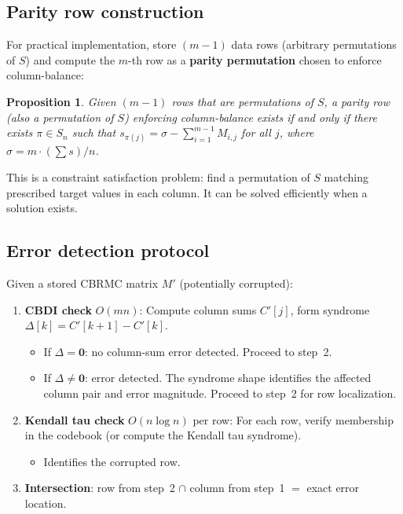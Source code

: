 \documentclass[11pt]{article}
\newtheorem{proposition}[theorem]{Proposition}
\begin{document}
\subsection{Parity row construction}

For practical implementation, store $(m-1)$ data rows (arbitrary permutations of $S$) and compute the $m$-th row as a \textbf{parity permutation} chosen to enforce column-balance:

\begin{proposition}
Given $(m-1)$ rows that are permutations of $S$, a parity row (also a permutation of $S$) enforcing column-balance exists if and only if there exists $\pi \in S_n$ such that $s_{\pi(j)} = \sigma - \sum_{i=1}^{m-1} M_{i,j}$ for all $j$, where $\sigma = m \cdot (\sum s)/n$.
\end{proposition}

This is a constraint satisfaction problem: find a permutation of $S$ matching prescribed target values in each column. It can be solved efficiently when a solution exists.

\subsection{Error detection protocol}

Given a stored CBRMC matrix $M'$ (potentially corrupted):

\begin{enumerate}
\item \textbf{CBDI check} $O(mn)$: Compute column sums $C'[j]$, form syndrome $\Delta[k] = C'[k+1] - C'[k]$.
\begin{itemize}
\item If $\Delta = \mathbf{0}$: no column-sum error detected. Proceed to step~2.
\item If $\Delta \neq \mathbf{0}$: error detected. The syndrome shape identifies the affected column pair and error magnitude. Proceed to step~2 for row localization.
\end{itemize}
\item \textbf{Kendall tau check} $O(n \log n)$ per row: For each row, verify membership in the codebook (or compute the Kendall tau syndrome).
\begin{itemize}
\item Identifies the corrupted row.
\end{itemize}
\item \textbf{Intersection}: row from step~2 $\cap$ column from step~1 $=$ exact error location.
\end{enumerate}
\end{document}
